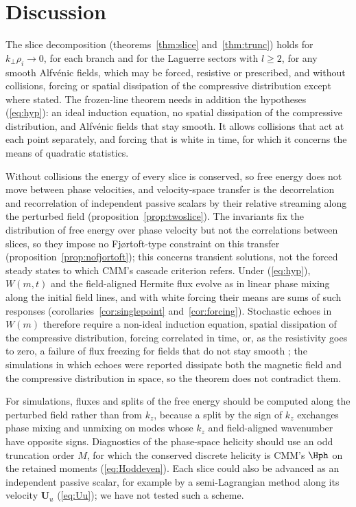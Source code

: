 \section{Discussion}\label{sec:discussion}

The slice decomposition (theorems~\ref{thm:slice} and~\ref{thm:trunc}) holds for $k_\perp\rho_i\to0$, for each branch and for the Laguerre sectors with $l\ge2$, for any smooth Alfv\'enic fields, which may be forced, resistive or prescribed, and without collisions, forcing or spatial dissipation of the compressive distribution except where stated. The frozen-line theorem needs in addition the hypotheses (\ref{eq:hyp}): an ideal induction equation, no spatial dissipation of the compressive distribution, and Alfv\'enic fields that stay smooth. It allows collisions that act at each point separately, and forcing that is white in time, for which it concerns the means of quadratic statistics.

Without collisions the energy of every slice is conserved, so free energy does not move between phase velocities, and velocity-space transfer is the decorrelation and recorrelation of independent passive scalars by their relative streaming along the perturbed field (proposition~\ref{prop:twoslice}). The invariants fix the distribution of free energy over phase velocity but not the correlations between slices, so they impose no Fj{\o}rtoft-type constraint on this transfer (proposition~\ref{prop:nofjortoft}); this concerns transient solutions, not the forced steady states to which CMM's cascade criterion refers. Under (\ref{eq:hyp}), $W(m,t)$ and the field-aligned Hermite flux evolve as in linear phase mixing along the initial field lines, and with white forcing their means are sums of such responses (corollaries~\ref{cor:singlepoint} and~\ref{cor:forcing}). Stochastic echoes in $W(m)$ therefore require a non-ideal induction equation, spatial dissipation of the compressive distribution, forcing correlated in time, or, as the resistivity goes to zero, a failure of flux freezing for fields that do not stay smooth \citep{Eyink2013,Eyink2018,Jafari2026}; the simulations in which echoes were reported \citep{Meyrand2019} dissipate both the magnetic field and the compressive distribution in space, so the theorem does not contradict them.

For simulations, fluxes and splits of the free energy should be computed along the perturbed field rather than from $k_z$, because a split by the sign of $k_z$ exchanges phase mixing and unmixing on modes whose $k_z$ and field-aligned wavenumber have opposite signs. Diagnostics of the phase-space helicity should use an odd truncation order $M$, for which the conserved discrete helicity is CMM's $\Hph$ on the retained moments (\ref{eq:Hoddeven}). Each slice could also be advanced as an independent passive scalar, for example by a semi-Lagrangian method along its velocity $\boldsymbol U_u$ (\ref{eq:Uu}); we have not tested such a scheme.

